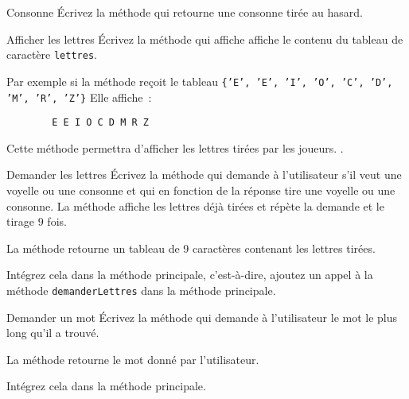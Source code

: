 \documentclass[a4paper,11pt]{article}
\begin{document}
 	\begin{Exercice}{Consonne}
		\'Ecrivez la méthode  qui retourne une consonne 
		tirée au hasard.
	\end{Exercice} 

 	\begin{Exercice}{Afficher les lettres}
 		\'Ecrivez la méthode 
		qui affiche affiche le contenu du tableau de caractère \texttt{lettres}.
		
		Par exemple si la méthode reçoit le tableau 
		\texttt{\{'E', 'E', 'I', 'O', 'C', 'D', 'M', 'R', 'Z'\}}
		Elle affiche~:
		
		\begin{verbatim}
		E E I O C D M R Z
		\end{verbatim}
		
		Cette méthode permettra d'afficher les lettres tirées par les joueurs.
.
	\end{Exercice} 

 	\begin{Exercice}{Demander les lettres}
		\'Ecrivez la méthode 
		qui demande à l'utilisateur s'il veut une voyelle ou une consonne
		et qui en fonction de la réponse tire une voyelle ou une consonne.
		La méthode affiche les lettres déjà tirées et répète la demande
		et le tirage 9 fois.
		 
		La méthode retourne un tableau de 9 caractères contenant les lettres tirées. 
		
		Intégrez cela dans la méthode principale, c'est-à-dire, ajoutez un appel à 
		la méthode \texttt{demanderLettres} dans la méthode principale.
	\end{Exercice} 

	
 	\begin{Exercice}{Demander un mot}
		\'Ecrivez la méthode 
		qui demande à l'utilisateur le mot le plus long qu'il a trouvé.
		 
		La méthode retourne le mot donné par l'utilisateur. 
		
		Intégrez cela dans la méthode principale.
	\end{Exercice} 
	
\end{document}
